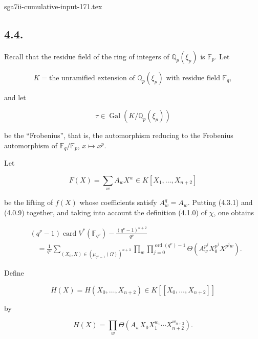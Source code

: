 \begin{filecontents*}{sga7ii-cumulative-input-171.tex}
\subsection*{4.4.}
Recall that the residue field of the ring of integers of
$\mathbb Q_p(\xi_p)$ is $\mathbb F_p$. Let

\begin{equation}\tag{4.4.0}
K=\text{the unramified extension of $\mathbb Q_p(\xi_p)$ with residue
field $\mathbb F_q$},
\end{equation}

and let

\begin{equation}\tag{4.4.1}
\tau\in\operatorname{Gal}(K/\mathbb Q_p(\xi_p))
\end{equation}

be the ``Frobenius'', that is, the automorphism reducing to the Frobenius
automorphism of $\mathbb F_q/\mathbb F_p$, $x\longmapsto x^p$.

Let

\begin{equation}\tag{4.4.2}
F(X)=\sum_w A_wX^w\in K[X_1,\ldots,X_{n+2}]
\end{equation}

be the lifting of $f(X)$ whose coefficients satisfy $A_w^q=A_w$.
Putting (4.3.1) and (4.0.9) together, and taking into account the
definition (4.1.0) of $\chi$, one obtains

\begin{equation}\tag{4.4.3}
\begin{aligned}
&(q^\nu-1)\operatorname{card}V^*(\mathbb F_{q^\nu})
-\frac{(q^\nu-1)^{n+2}}{q^\nu}\\
&\quad=\frac1{q^\nu}
\sum_{(X_0,X)\in(\mu_{q^\nu-1}(\Omega))^{n+3}}
\prod_w\prod_{j=0}^{\operatorname{ord}(q^\nu)-1}
\Theta\!\left(A_w^{p^j}X_0^{p^j}X^{p^jw}\right).
\end{aligned}
\end{equation}

Define

\[
H(X)=H(X_0,\ldots,X_{n+2})\in K[[X_0,\ldots,X_{n+2}]]
\]

by

\begin{equation}\tag{4.4.4}
H(X)=\prod_w
\Theta\!\left(A_wX_0X_1^{w_1}\cdots X_{n+2}^{w_{n+2}}\right).
\end{equation}


\end{filecontents*}
